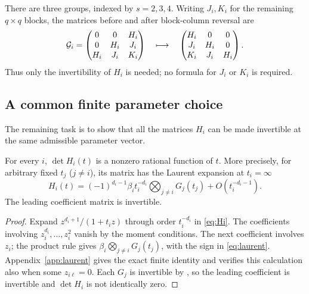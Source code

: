 \begin{example}[Column reversal when $d_i=5$]\label{ex:reversal}
There are three groups, indexed by $s=2,3,4$. Writing $J_i,K_i$
for the remaining $q\times q$ blocks, the matrices before and
after block-column reversal are
\begin{equation}\label{eq:anti-example}
\mathcal G_i=
\begin{pmatrix}
0&0&H_i\\
0&H_i&J_i\\
H_i&J_i&K_i
\end{pmatrix}
\quad\longmapsto\quad
\begin{pmatrix}
H_i&0&0\\
J_i&H_i&0\\
K_i&J_i&H_i
\end{pmatrix}.
\end{equation}
Thus only the invertibility of $H_i$ is needed; no formula for
$J_i$ or $K_i$ is required.
\end{example}

\subsection{A common finite parameter choice}
The remaining task is to show that all the matrices $H_i$ can be
made invertible at the same admissible parameter vector.

\begin{lemma}\label{lem:Hi}
For every $i$, $\det H_i(t)$ is a nonzero rational function of $t$.
More precisely, for arbitrary fixed $t_j$ ($j\ne i$), its matrix has
the Laurent expansion at $t_i=\infty$
\begin{equation}\label{eq:laurent}
H_i(t)=(-1)^{d_i-1}\beta_i t_i^{-d_i}
\bigotimes_{j\ne i}G_j(t_j)+O(t_i^{-d_i-1}).
\end{equation}
The leading coefficient matrix is invertible.
\end{lemma}
\begin{proof}
Expand $z^{d_i+1}/(1+t_i z)$ through order $t_i^{-d_i}$ in
\eqref{eq:Hi}. The coefficients involving $z_i^{d_i},\ldots,z_i^2$
vanish by the moment conditions. The next coefficient involves $z_i$;
the product rule gives $\beta_i\bigotimes_{j\ne i}G_j(t_j)$,
with the sign in \eqref{eq:laurent}. Appendix~\ref{app:laurent}
gives the exact finite identity and verifies this calculation also
when some $z_{i\ell}=0$.
Each $G_j$ is invertible by , so the leading
coefficient is invertible and $\det H_i$ is not identically zero.
\end{proof}

